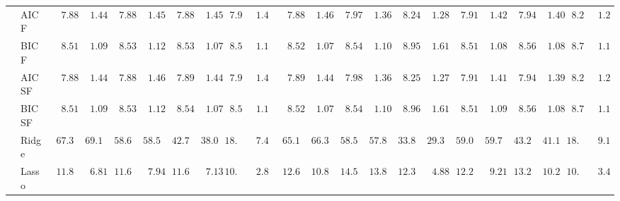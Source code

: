 \begin{tabular}{ll|ll|llllll|llllll|llllll}
 & AIC F  & $\phantom{00}7.88$ & $\phantom{00}1.44$ & $\phantom{00}7.88$ & $\phantom{00}1.45$ & $\phantom{00}7.88$ & $\phantom{00}1.45$ & $\phantom{0}7.90$ & $\phantom{0}1.43$ & $\phantom{00}7.88$ & $\phantom{00}1.46$ & $\phantom{00}7.97$ & $\phantom{00}1.36$ & $\phantom{00}8.24$ & $\phantom{00}1.28$ & $\phantom{00}7.91$ & $\phantom{00}1.42$ & $\phantom{00}7.94$ & $\phantom{00}1.40$ & $\phantom{0}8.21$ & $\phantom{0}1.23$ \\
 & BIC F  & $\phantom{00}8.51$ & $\phantom{00}1.09$ & $\phantom{00}8.53$ & $\phantom{00}1.12$ & $\phantom{00}8.53$ & $\phantom{00}1.07$ & $\phantom{0}8.59$ & $\phantom{0}1.13$ & $\phantom{00}8.52$ & $\phantom{00}1.07$ & $\phantom{00}8.54$ & $\phantom{00}1.10$ & $\phantom{00}8.95$ & $\phantom{00}1.61$ & $\phantom{00}8.51$ & $\phantom{00}1.08$ & $\phantom{00}8.56$ & $\phantom{00}1.08$ & $\phantom{0}8.70$ & $\phantom{0}1.16$ \\
 & AIC SF  & $\phantom{00}7.88$ & $\phantom{00}1.44$ & $\phantom{00}7.88$ & $\phantom{00}1.46$ & $\phantom{00}7.89$ & $\phantom{00}1.44$ & $\phantom{0}7.90$ & $\phantom{0}1.43$ & $\phantom{00}7.89$ & $\phantom{00}1.44$ & $\phantom{00}7.98$ & $\phantom{00}1.36$ & $\phantom{00}8.25$ & $\phantom{00}1.27$ & $\phantom{00}7.91$ & $\phantom{00}1.41$ & $\phantom{00}7.94$ & $\phantom{00}1.39$ & $\phantom{0}8.21$ & $\phantom{0}1.23$ \\
 & BIC SF  & $\phantom{00}8.51$ & $\phantom{00}1.09$ & $\phantom{00}8.53$ & $\phantom{00}1.12$ & $\phantom{00}8.54$ & $\phantom{00}1.07$ & $\phantom{0}8.59$ & $\phantom{0}1.13$ & $\phantom{00}8.52$ & $\phantom{00}1.07$ & $\phantom{00}8.54$ & $\phantom{00}1.10$ & $\phantom{00}8.96$ & $\phantom{00}1.61$ & $\phantom{00}8.51$ & $\phantom{00}1.09$ & $\phantom{00}8.56$ & $\phantom{00}1.08$ & $\phantom{0}8.70$ & $\phantom{0}1.16$ \\
 & Ridge  & $\phantom{0}67.36$ & $\phantom{0}69.16$ & $\phantom{0}58.68$ & $\phantom{0}58.50$ & $\phantom{0}42.73$ & $\phantom{0}38.02$ & $18.74$ & $\phantom{0}7.40$ & $\phantom{0}65.19$ & $\phantom{0}66.39$ & $\phantom{0}58.54$ & $\phantom{0}57.87$ & $\phantom{0}33.80$ & $\phantom{0}29.35$ & $\phantom{0}59.09$ & $\phantom{0}59.74$ & $\phantom{0}43.24$ & $\phantom{0}41.13$ & $18.73$ & $\phantom{0}9.17$ \\
 & Lasso  & $\phantom{0}11.83$ & $\phantom{00}6.81$ & $\phantom{0}11.65$ & $\phantom{00}7.94$ & $\phantom{0}11.63$ & $\phantom{00}7.13$ & $10.63$ & $\phantom{0}2.82$ & $\phantom{0}12.64$ & $\phantom{0}10.88$ & $\phantom{0}14.55$ & $\phantom{0}13.80$ & $\phantom{0}12.38$ & $\phantom{00}4.88$ & $\phantom{0}12.25$ & $\phantom{00}9.21$ & $\phantom{0}13.24$ & $\phantom{0}10.21$ & $10.95$ & $\phantom{0}3.45$ \\

\end{tabular}

